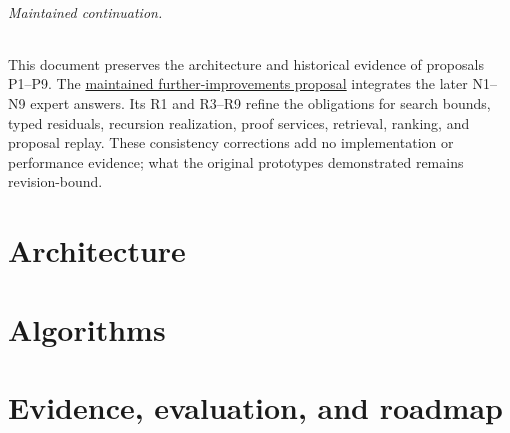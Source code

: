 \documentclass[11pt,a4paper]{article}
\theoremstyle{definition}
\theoremstyle{plain}
\theoremstyle{remark}
\begin{document}
\paragraph{Maintained continuation.} This document preserves the architecture and historical evidence of proposals P1--P9. The \href{../11-further-improvements/Leant2-next.pdf}{maintained further-improvements proposal} integrates the later N1--N9 expert answers. Its R1 and R3--R9 refine the obligations for search bounds, typed residuals, recursion realization, proof services, retrieval, ranking, and proposal replay. These consistency corrections add no implementation or performance evidence; what the original prototypes demonstrated remains revision-bound.

\clearpage
\tableofcontents
\clearpage

\part{Architecture}\label{part:architecture}








\part{Algorithms}\label{part:algorithms}







\part{Evidence, evaluation, and roadmap}\label{part:evidence}


\appendix

\end{document}

